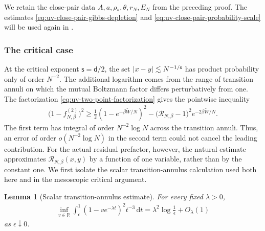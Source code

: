\documentclass[11pt,reqno]{amsart}
\numberwithin{equation}{section}
\theoremstyle{plain}
\newtheorem{lemma}[lemma]{Lemma}
\theoremstyle{remark}
\DeclarePairedDelimiter{\abs}{\lvert}{\rvert}
\renewcommand{\d}{\mathsf{d}}
\newcommand{\md}{\mathrm{d}}
\newcommand{\R}{{\mathbb{R}}}
\newcommand{\tl}{\widetilde}
\newcommand{\be}{\beta}
\newcommand{\s}{\mathsf{s}}
\begin{document}
We retain the close-pair data \(A,a,\rho_*,\theta,r_N,E_N\) from the preceding proof.  The estimates \eqref{eq:uv-close-pair-gibbs-depletion} and \eqref{eq:uv-close-pair-probability-scale} will be used again in .

\subsubsection{The critical case}
\label{subsubsec:uv-critical-two-point}

At the critical exponent \(\s=\d/2\), the set \(\abs{x-y}\lesssim N^{-1/\s}\) has product probability only of order \(N^{-2}\).  The additional logarithm comes from the range of transition annuli on which the mutual Boltzmann factor differs perturbatively from one.  The factorization \eqref{eq:uv-two-point-factorization} gives the pointwise inequality
\begin{align}\label{eq:uv-critical-basic-decomposition}
 \bigl(1-f_{N,\be}^{(2)}\bigr)^2
 \ge\frac12\left(1-e^{-\be\tl W/N}\right)^2
 -\bigl(\mathcal R_{N,\be}-1\bigr)^2e^{-2\be\tl W/N}.
\end{align}
The first term has integral of order \(N^{-2}\log N\) across the transition annuli.  Thus, an error of order \(o(N^{-2}\log N)\) in the second term could not cancel the leading contribution.  For the actual residual prefactor, however, the natural estimate approximates \(\mathcal R_{N,\be}(x,y)\) by a function of one variable, rather than by the constant one.  We first isolate the scalar transition-annulus calculation used both here and in the mesoscopic critical argument.

\begin{lemma}[Scalar transition-annulus estimate]
\label{lem:uv-scalar-transition-annulus}
For every fixed \(\lambda>0\),
\begin{align}\label{eq:uv-scalar-transition-annulus-estimate}
 \inf_{v\in\R}\int_\epsilon^1
 \left(1-ve^{-\lambda t}\right)^2t^{-3}\,\md t
 =\lambda^2\log\frac1\epsilon+O_\lambda(1)
\end{align}
as \(\epsilon\downarrow0\).
\end{lemma}
\end{document}
